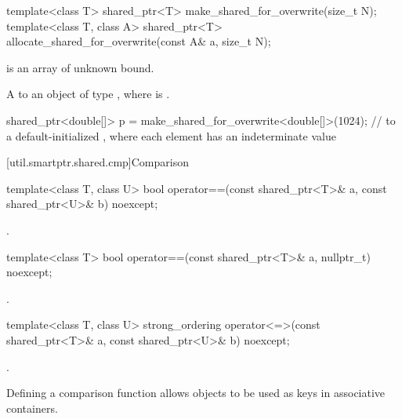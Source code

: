 %
%
\begin{itemdecl}
template<class T>
  shared_ptr<T> make_shared_for_overwrite(size_t N);
template<class T, class A>
  shared_ptr<T> allocate_shared_for_overwrite(const A& a, size_t N);
\end{itemdecl}

\begin{itemdescr}
\pnum
\constraints
{} is an array of unknown bound.

\pnum
\returns
A  to an object of type ,
where  is .

\pnum
\begin{example}
\begin{codeblock}
shared_ptr<double[]> p = make_shared_for_overwrite<double[]>(1024);
  //  to a default-initialized , where each element has an indeterminate value
\end{codeblock}
\end{example}
\end{itemdescr}

[util.smartptr.shared.cmp]{Comparison}

%
\begin{itemdecl}
template<class T, class U>
  bool operator==(const shared_ptr<T>& a, const shared_ptr<U>& b) noexcept;
\end{itemdecl}

\begin{itemdescr}
\pnum
\returns
{}.
\end{itemdescr}

%
\begin{itemdecl}
template<class T>
  bool operator==(const shared_ptr<T>& a, nullptr_t) noexcept;
\end{itemdecl}

\begin{itemdescr}
\pnum
\returns
{}.
\end{itemdescr}

%
\begin{itemdecl}
template<class T, class U>
  strong_ordering operator<=>(const shared_ptr<T>& a, const shared_ptr<U>& b) noexcept;
\end{itemdecl}

\begin{itemdescr}
\pnum
\returns
{}.

\pnum
\begin{note}
Defining a comparison function allows  objects
to be used as keys in associative containers.
\end{note}
\end{itemdescr}

